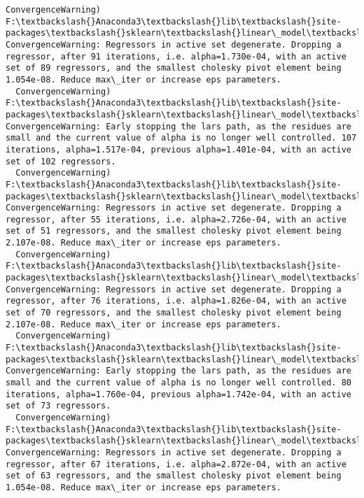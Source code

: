 \documentclass[11pt]{article}
\begin{document}
\begin{Verbatim}[commandchars=\\\{\}]
  ConvergenceWarning)
F:\textbackslash{}Anaconda3\textbackslash{}lib\textbackslash{}site-packages\textbackslash{}sklearn\textbackslash{}linear\_model\textbackslash{}least\_angle.py:313: ConvergenceWarning: Regressors in active set degenerate. Dropping a regressor, after 91 iterations, i.e. alpha=1.730e-04, with an active set of 89 regressors, and the smallest cholesky pivot element being 1.054e-08. Reduce max\_iter or increase eps parameters.
  ConvergenceWarning)
F:\textbackslash{}Anaconda3\textbackslash{}lib\textbackslash{}site-packages\textbackslash{}sklearn\textbackslash{}linear\_model\textbackslash{}least\_angle.py:339: ConvergenceWarning: Early stopping the lars path, as the residues are small and the current value of alpha is no longer well controlled. 107 iterations, alpha=1.517e-04, previous alpha=1.401e-04, with an active set of 102 regressors.
  ConvergenceWarning)
F:\textbackslash{}Anaconda3\textbackslash{}lib\textbackslash{}site-packages\textbackslash{}sklearn\textbackslash{}linear\_model\textbackslash{}least\_angle.py:313: ConvergenceWarning: Regressors in active set degenerate. Dropping a regressor, after 55 iterations, i.e. alpha=2.726e-04, with an active set of 51 regressors, and the smallest cholesky pivot element being 2.107e-08. Reduce max\_iter or increase eps parameters.
  ConvergenceWarning)
F:\textbackslash{}Anaconda3\textbackslash{}lib\textbackslash{}site-packages\textbackslash{}sklearn\textbackslash{}linear\_model\textbackslash{}least\_angle.py:313: ConvergenceWarning: Regressors in active set degenerate. Dropping a regressor, after 76 iterations, i.e. alpha=1.826e-04, with an active set of 70 regressors, and the smallest cholesky pivot element being 2.107e-08. Reduce max\_iter or increase eps parameters.
  ConvergenceWarning)
F:\textbackslash{}Anaconda3\textbackslash{}lib\textbackslash{}site-packages\textbackslash{}sklearn\textbackslash{}linear\_model\textbackslash{}least\_angle.py:339: ConvergenceWarning: Early stopping the lars path, as the residues are small and the current value of alpha is no longer well controlled. 80 iterations, alpha=1.760e-04, previous alpha=1.742e-04, with an active set of 73 regressors.
  ConvergenceWarning)
F:\textbackslash{}Anaconda3\textbackslash{}lib\textbackslash{}site-packages\textbackslash{}sklearn\textbackslash{}linear\_model\textbackslash{}least\_angle.py:313: ConvergenceWarning: Regressors in active set degenerate. Dropping a regressor, after 67 iterations, i.e. alpha=2.872e-04, with an active set of 63 regressors, and the smallest cholesky pivot element being 1.054e-08. Reduce max\_iter or increase eps parameters.

\end{Verbatim}
\end{document}
